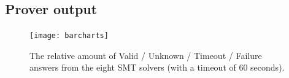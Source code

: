 %
%

\subsection{Prover output}
\label{sub:prover-output}

\begin{figure}
	\centering
	\texttt{[image: barcharts]}
	\caption[The relative amount of Valid / Unknown / Timeout / Failure answers from the eight SMT solvers]{The relative amount of Valid / Unknown / Timeout / Failure answers from the eight SMT solvers (with a timeout of 60 seconds). }
	\label{fig:barcharts}
\end{figure}


